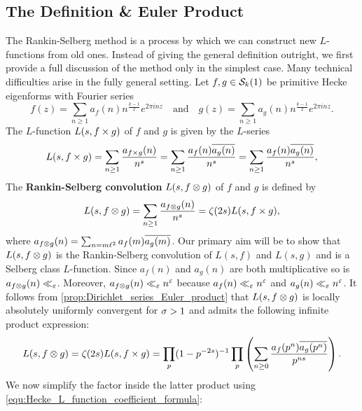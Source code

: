     \subsection*{The Definition \& Euler Product}
      The Rankin-Selberg method is a process by which we can construct new $L$-functions from old ones. Instead of giving the general definition outright, we first provide a full discussion of the method only in the simplest case. Many technical difficulties arise in the fully general setting. Let $f,g \in \mathcal{S}_{k}(1)$ be primitive Hecke eigenforms with Fourier series
      \[
        f(z) = \sum_{n \ge 1}a_{f}(n)n^{\frac{k-1}{2}}e^{2\pi inz} \quad \text{and} \quad g(z) = \sum_{n \ge 1}a_{g}(n)n^{\frac{k-1}{2}}e^{2\pi inz}.
      \]
      The $L$-function $L(s,f \times g)$ of $f$ and $g$ is given by the $L$-series
      \[
        L(s,f \times g) = \sum_{n \ge 1}\frac{a_{f \times g}(n)}{n^{s}} = \sum_{n \ge 1}\frac{a_{f}(n)\overline{a_{g}(n)}}{n^{s}} = \sum_{n \ge 1}\frac{a_{f}(n)\overline{a_{g}(n)}}{n^{s}},
      \]
      The \textbf{Rankin-Selberg convolution} $L(s,f \otimes g)$ of $f$ and $g$ is defined by
      \[
        L(s,f \otimes g) = \sum_{n \ge 1}\frac{a_{f \otimes g}(n)}{n^{s}} = \zeta(2s)L(s,f \times g),
      \]
      where $a_{f \otimes g}(n) = \sum_{n = m\ell^{2}}a_{f}(m)\overline{a_{g}(m)}$. Our primary aim will be to show that $L(s,f \otimes g)$ is the Rankin-Selberg convolution of $L(s,f)$ and $L(s,g)$ and is a Selberg class $L$-function. Since $a_{f}(n)$ and $a_{g}(n)$ are both multiplicative so is $a_{f \otimes g}(n) \ll_{\varepsilon}$. Moreover, $a_{f \otimes g}(n) \ll_{\varepsilon} n^{\varepsilon}$ because $a_{f}(n) \ll_{\varepsilon} n^{\varepsilon}$ and $a_{g}(n) \ll_{\varepsilon} n^{\varepsilon}$. It follows from \cref{prop:Dirichlet_series_Euler_product} that $L(s,f \otimes g)$ is locally absolutely uniformly convergent for $\sigma > 1$ and admits the following infinite product expression:
      \[
        L(s,f \otimes g) = \zeta(2s)L(s,f \times g) = \prod_{p}(1-p^{-2s})^{-1}\prod_{p}\left(\sum_{n \ge 0}\frac{a_{f}(p^{n})\overline{a_{g}(p^{n})}}{p^{ns}}\right).
      \]
      We now simplify the factor inside the latter product using \cref{equ:Hecke_L_function_coefficient_formula}:
      \begingroup
      \allowdisplaybreaks
